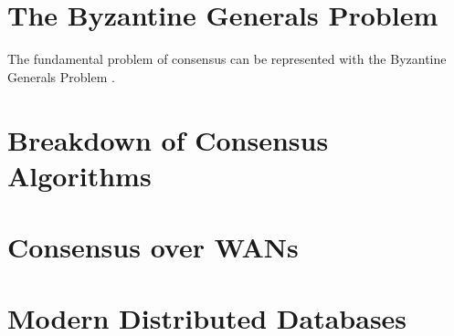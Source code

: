 \documentclass{article}
\begin{document}
\section{The Byzantine Generals Problem}

The fundamental problem of consensus can be represented with the Byzantine Generals Problem \cite{LamportGeneralsProblem}.

\section{Breakdown of Consensus Algorithms}

\section{Consensus over WANs}

\section{Modern Distributed Databases}



\end{document}
